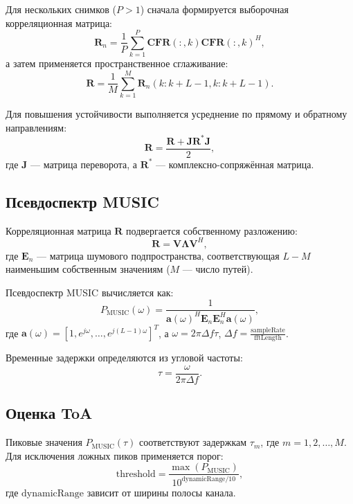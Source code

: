\documentclass{article}
\begin{document}
Для нескольких снимков (\( P > 1 \)) сначала формируется выборочная корреляционная матрица:
\begin{equation}
\mathbf{R}_n = \frac{1}{P} \sum_{k=1}^{P} \mathbf{CFR}(:, k) \mathbf{CFR}(:, k)^H,
\end{equation}
а затем применяется пространственное сглаживание:
\begin{equation}
\mathbf{R} = \frac{1}{M} \sum_{k=1}^{M} \mathbf{R}_n(k:k+L-1, k:k+L-1).
\end{equation}

Для повышения устойчивости выполняется усреднение по прямому и обратному направлениям:
\begin{equation}
\mathbf{R} = \frac{\mathbf{R} + \mathbf{J} \mathbf{R}^* \mathbf{J}}{2},
\end{equation}
где \( \mathbf{J} \) --- матрица переворота, а \( \mathbf{R}^* \) --- комплексно-сопряжённая матрица.

\subsection{Псевдоспектр MUSIC}

Корреляционная матрица \( \mathbf{R} \) подвергается собственному разложению:
\begin{equation}
\mathbf{R} = \mathbf{V} \mathbf{\Lambda} \mathbf{V}^H,
\end{equation}
где \( \mathbf{E}_n \) --- матрица шумового подпространства, соответствующая \( L - M \) наименьшим собственным значениям (\( M \) --- число путей).

Псевдоспектр MUSIC вычисляется как:
\begin{equation}
P_{\text{MUSIC}}(\omega) = \frac{1}{\mathbf{a}(\omega)^H \mathbf{E}_n \mathbf{E}_n^H \mathbf{a}(\omega)},
\end{equation}
где \( \mathbf{a}(\omega) = [1, e^{j \omega}, \dots, e^{j (L-1) \omega}]^T \), а \( \omega = 2\pi \Delta f \tau \), \( \Delta f = \frac{\text{sampleRate}}{\text{fftLength}} \).

Временные задержки определяются из угловой частоты:
\begin{equation}
\tau = \frac{\omega}{2\pi \Delta f}.
\end{equation}

\subsection{Оценка ToA}

Пиковые значения \( P_{\text{MUSIC}}(\tau) \) соответствуют задержкам \( \tau_m \), где \( m = 1, 2, \dots, M \). Для исключения ложных пиков применяется порог:
\begin{equation}
\text{threshold} = \frac{\max(P_{\text{MUSIC}})}{10^{\text{dynamicRange}/10}},
\end{equation}
где \( \text{dynamicRange} \) зависит от ширины полосы канала.
\end{document}

